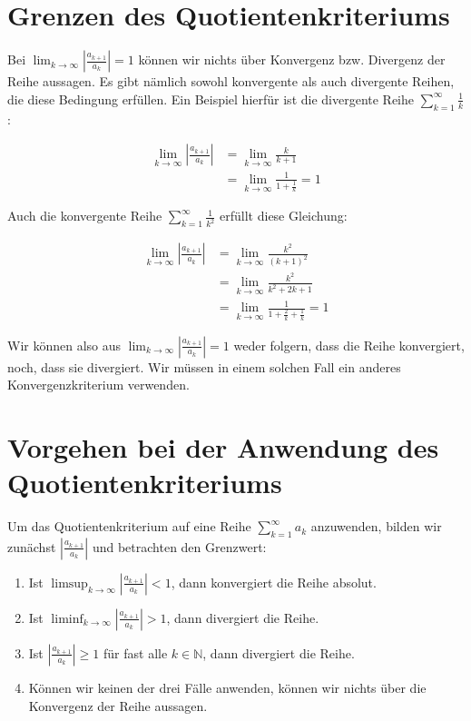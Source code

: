 \documentclass[fontsize=9pt,
               parskip=half-,
               DIV=14,
               listof=chapterentry,
               tocflat]{scrbook}
\begin{document}
\section{Grenzen des Quotientenkriteriums}

Bei $\lim _{k\to \infty }\left|{\tfrac {a_{k+1}}{a_{k}}}\right|=1$ können wir nichts über Konvergenz bzw. Divergenz der Reihe aussagen. Es gibt nämlich sowohl konvergente als auch divergente Reihen, die diese Bedingung erfüllen. Ein Beispiel hierfür ist die divergente Reihe $\sum _{k=1}^{\infty }{\frac {1}{k}}$:

\begin{align*}
\lim _{k\to \infty }\left|{\frac {a_{k+1}}{a_{k}}}\right|&=\lim _{k\to \infty }{\frac {k}{k+1}}\\[0.5em]&=\lim _{k\to \infty }{\frac {1}{1+{\frac {1}{k}}}}=1
\end{align*}

Auch die konvergente Reihe $\sum _{k=1}^{\infty }{\frac {1}{k^{2}}}$ erfüllt diese Gleichung:

\begin{align*}
\lim _{k\to \infty }\left|{\frac {a_{k+1}}{a_{k}}}\right|&=\lim _{k\to \infty }{\frac {k^{2}}{(k+1)^{2}}}\\[0.5em]&=\lim _{k\to \infty }{\frac {k^{2}}{k^{2}+2k+1}}\\[0.5em]&=\lim _{k\to \infty }{\frac {1}{1+{\frac {2}{k}}+{\frac {1}{k}}}}=1
\end{align*}

Wir können also aus $\lim _{k\to \infty }\left|{\tfrac {a_{k+1}}{a_{k}}}\right|=1$ weder folgern, dass die Reihe konvergiert, noch, dass sie divergiert. Wir müssen in einem solchen Fall ein anderes Konvergenzkriterium verwenden.

\section{Vorgehen bei der Anwendung des Quotientenkriteriums}

Um das Quotientenkriterium auf eine Reihe $\sum _{k=1}^{\infty }a_{k}$ anzuwenden, bilden wir zunächst $\left|{\tfrac {a_{k+1}}{a_{k}}}\right|$ und betrachten den Grenzwert:

\begin{enumerate}
\item Ist $\limsup _{k\to \infty }\left|{\tfrac {a_{k+1}}{a_{k}}}\right|<1$, dann konvergiert die Reihe absolut.
\item Ist $\liminf _{k\to \infty }\left|{\tfrac {a_{k+1}}{a_{k}}}\right|>1$, dann divergiert die Reihe.
\item Ist $\left|{\tfrac {a_{k+1}}{a_{k}}}\right|\geq 1$ für fast alle $k\in \mathbb {N} $, dann divergiert die Reihe.
\item Können wir keinen der drei Fälle anwenden, können wir nichts über die Konvergenz der Reihe aussagen.
\end{enumerate}
\end{document}
